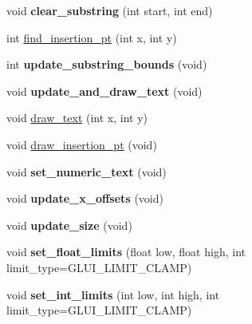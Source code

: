 \begin{DoxyCompactItemize}
\item 
\hypertarget{classGLUI__EditText_a7d8d760a5559a3317a8a080877fdab4b}{void {\bfseries clear\-\_\-substring} (int start, int end)}\label{classGLUI__EditText_a7d8d760a5559a3317a8a080877fdab4b}

\item 
int \hyperlink{classGLUI__EditText_adb7c9266e9e33ec38a2d81fbe83421b2}{find\-\_\-insertion\-\_\-pt} (int x, int y)
\item 
\hypertarget{classGLUI__EditText_a9787add80a6790d07796499508ebf62b}{int {\bfseries update\-\_\-substring\-\_\-bounds} (void)}\label{classGLUI__EditText_a9787add80a6790d07796499508ebf62b}

\item 
\hypertarget{classGLUI__EditText_acbd51f12d68de3e4444ac21e709aef50}{void {\bfseries update\-\_\-and\-\_\-draw\-\_\-text} (void)}\label{classGLUI__EditText_acbd51f12d68de3e4444ac21e709aef50}

\item 
void \hyperlink{classGLUI__EditText_a37917739d5f240356d893b3d07d9afe6}{draw\-\_\-text} (int x, int y)
\item 
void \hyperlink{classGLUI__EditText_acc67640b9e92d5c6c84e4f685762aaf4}{draw\-\_\-insertion\-\_\-pt} (void)
\item 
\hypertarget{classGLUI__EditText_a7b1c3f892a2c340e8c7328a260d92d08}{void {\bfseries set\-\_\-numeric\-\_\-text} (void)}\label{classGLUI__EditText_a7b1c3f892a2c340e8c7328a260d92d08}

\item 
\hypertarget{classGLUI__EditText_a7875ec7ab7213fbe52370436b4a8af8c}{void {\bfseries update\-\_\-x\-\_\-offsets} (void)}\label{classGLUI__EditText_a7875ec7ab7213fbe52370436b4a8af8c}

\item 
\hypertarget{classGLUI__EditText_acb10946b2666d84c57a321cda5ab2abb}{void {\bfseries update\-\_\-size} (void)}\label{classGLUI__EditText_acb10946b2666d84c57a321cda5ab2abb}

\item 
\hypertarget{classGLUI__EditText_a3b46c3540795e49983394d3bfdb89fb6}{void {\bfseries set\-\_\-float\-\_\-limits} (float low, float high, int limit\-\_\-type=G\-L\-U\-I\-\_\-\-L\-I\-M\-I\-T\-\_\-\-C\-L\-A\-M\-P)}\label{classGLUI__EditText_a3b46c3540795e49983394d3bfdb89fb6}

\item 
\hypertarget{classGLUI__EditText_a5761e028dc711efdc234f7211003a500}{void {\bfseries set\-\_\-int\-\_\-limits} (int low, int high, int limit\-\_\-type=G\-L\-U\-I\-\_\-\-L\-I\-M\-I\-T\-\_\-\-C\-L\-A\-M\-P)}\label{classGLUI__EditText_a5761e028dc711efdc234f7211003a500}


\end{DoxyCompactItemize}
